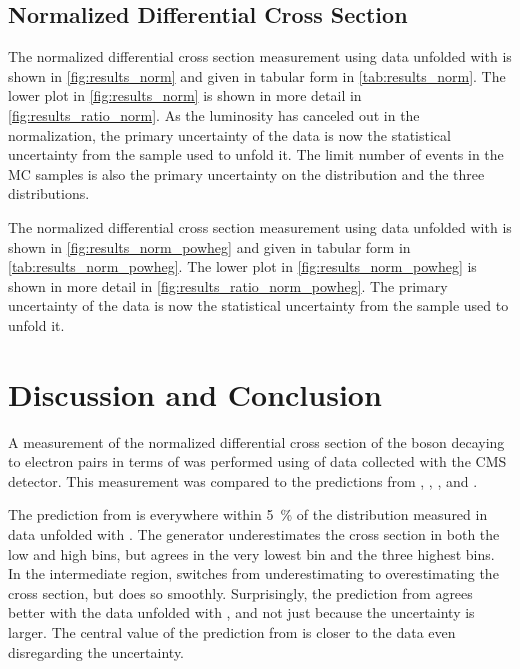 \subsection{Normalized Differential Cross Section}
\label{ssec:results_norm}

The normalized differential cross section measurement using data unfolded with
\MADGRAPH is shown in \cref{fig:results_norm} and given in tabular form in
\cref{tab:results_norm}. The lower plot in \cref{fig:results_norm} is
shown in more detail in \cref{fig:results_ratio_norm}. As the luminosity
has canceled out in the normalization, the primary uncertainty of the data is
now the statistical uncertainty from the \MADGRAPH sample used to unfold it.
The limit number of events in the MC samples is also the primary uncertainty on
the \MADGRAPH distribution and the three \POWHEG distributions.




The normalized differential cross section measurement using data unfolded with
\PPsixZtwo is shown in \cref{fig:results_norm_powheg} and given in tabular form
in \cref{tab:results_norm_powheg}. The lower plot in
\cref{fig:results_norm_powheg} is shown in more detail in
\cref{fig:results_ratio_norm_powheg}. The primary uncertainty of the data is
now the statistical uncertainty from the \POWHEG sample used to unfold it.




\clearpage
\section{Discussion and Conclusion}
\label{sec:discussion}

A measurement of the normalized differential cross section of the \Z boson
decaying to electron pairs in terms of \phistar was performed using
\GoodLumiNumber of \rootseight data collected with the CMS detector. This
measurement was compared to the predictions from \MGsixZtwo, \PPsixZtwo,
\PPeightTTfive, and \PPeightTTfourteen.

The prediction from \MADGRAPH is everywhere within \SI{5}{\percent} of the
distribution measured in data unfolded with \MADGRAPH. The generator
underestimates the cross section in both the low and high \phistar bins, but
agrees in the very lowest bin and the three highest bins. In the intermediate
region, \MADGRAPH switches from underestimating to overestimating the cross
section, but does so smoothly. Surprisingly, the prediction from \MADGRAPH
agrees better with the data unfolded with \PPsixZtwo, and not just because the
uncertainty is larger. The central value of the prediction from \MADGRAPH is
closer to the data even disregarding the uncertainty.

